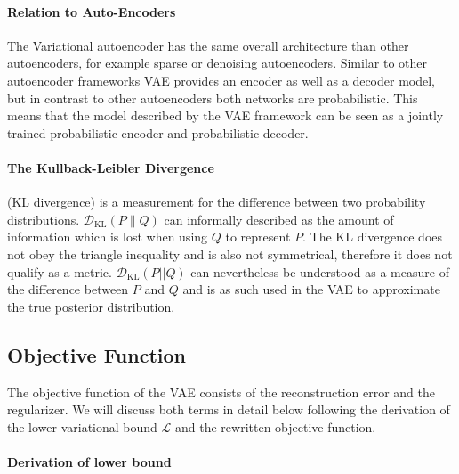 \paragraph{Relation to Auto-Encoders}
The Variational autoencoder has the same overall architecture than other autoencoders, for example sparse or denoising autoencoders.
Similar to other autoencoder frameworks VAE provides an encoder as well as a decoder model, but in contrast to other autoencoders both networks are probabilistic. This means that the model described by the VAE framework can be seen as a jointly trained probabilistic encoder and probabilistic decoder.



\paragraph{The Kullback-Leibler Divergence} (KL divergence) is a measurement for the difference between two probability distributions. $\mathcal{D}_{\mathrm{KL}}(P \| Q)$ can informally described as the amount of information which is lost when using $Q$ to represent $P$.
The KL divergence does not obey the triangle inequality and is also not symmetrical, therefore it does not qualify as a metric.
$\mathcal{D}_{\mathrm{KL}}(P||Q)$ can nevertheless be understood as a measure of the difference between $P$ and $Q$ and is as such used in the VAE to approximate the true posterior distribution.

\subsection{Objective Function}
The objective function of the VAE consists of the reconstruction error and the regularizer.
We will discuss both terms in detail below following the derivation of the lower variational bound $\mathcal{L}$ and the rewritten objective function.

\paragraph{Derivation of lower bound}


